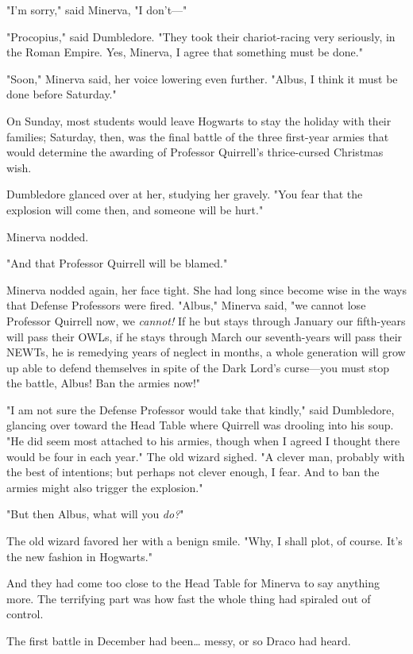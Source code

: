 "I'm sorry," said Minerva, "I don't---"

"Procopius," said Dumbledore. "They took their chariot-racing very seriously, 
in the Roman Empire. Yes, Minerva, I agree that something must be done."

"Soon," Minerva said, her voice lowering even further. "Albus, I think it must 
be done before Saturday."

On Sunday, most students would leave Hogwarts to stay the holiday with their 
families; Saturday, then, was the final battle of the three first-year armies 
that would determine the awarding of Professor Quirrell's thrice-cursed 
Christmas wish.

Dumbledore glanced over at her, studying her gravely. "You fear that the 
explosion will come then, and someone will be hurt."

Minerva nodded.

"And that Professor Quirrell will be blamed."

Minerva nodded again, her face tight. She had long since become wise in the 
ways that Defense Professors were fired. "Albus," Minerva said, "we cannot lose 
Professor Quirrell now, we \emph{cannot!} If he but stays through January our 
fifth-years will pass their OWLs, if he stays through March our seventh-years 
will pass their NEWTs, he is remedying years of neglect in months, a whole 
generation will grow up able to defend themselves in spite of the Dark Lord's 
curse---you must stop the battle, Albus! Ban the armies now!"

"I am not sure the Defense Professor would take that kindly," said Dumbledore, 
glancing over toward the Head Table where Quirrell was drooling into his soup. 
"He did seem most attached to his armies, though when I agreed I thought there 
would be four in each year." The old wizard sighed. "A clever man, probably 
with the best of intentions; but perhaps not clever enough, I fear. And to ban 
the armies might also trigger the explosion."

"But then Albus, what will you \emph{do?}"

The old wizard favored her with a benign smile. "Why, I shall plot, of course. 
It's the new fashion in Hogwarts."

And they had come too close to the Head Table for Minerva to say anything more.
\sbreak
The terrifying part was how fast the whole thing had spiraled out of control.

The first battle in December had been{\ldots} messy, or so Draco had heard.

